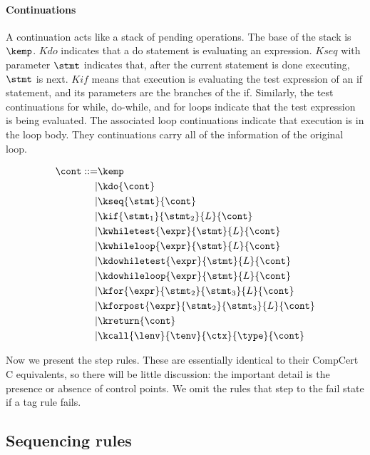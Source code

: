 \documentclass{article}
\begin{document}
\paragraph*{Continuations}
\label{app:continuations}

A continuation acts like a stack of pending operations. The base of the stack is
\(\kemp\). \(\mathit{Kdo}\) indicates that a do statement is evaluating an expression.
\(\mathit{Kseq}\) with parameter \(\stmt\) indicates that, after the current statement
is done executing, \(\stmt\) is next. \(\mathit{Kif}\) means that execution is evaluating
the test expression of an if statement, and its parameters are the branches of the
if. Similarly, the test continuations for while, do-while, and for loops indicate that
the test expression is being evaluated. The associated loop continuations indicate that
execution is in the loop body. They continuations carry all of the information of the original
loop.

\[\begin{split}
\cont ::= & \kemp \\
| & \kdo{\cont} \\
| & \kseq{\stmt}{\cont} \\
| & \kif{\stmt_1}{\stmt_2}{L}{\cont} \\
| & \kwhiletest{\expr}{\stmt}{L}{\cont} \\
| & \kwhileloop{\expr}{\stmt}{L}{\cont} \\
| & \kdowhiletest{\expr}{\stmt}{L}{\cont} \\
| & \kdowhileloop{\expr}{\stmt}{L}{\cont} \\
| & \kfor{\expr}{\stmt_2}{\stmt_3}{L}{\cont} \\
| & \kforpost{\expr}{\stmt_2}{\stmt_3}{L}{\cont} \\
| & \kreturn{\cont} \\
| & \kcall{\lenv}{\tenv}{\ctx}{\type}{\cont}
\end{split}\]

Now we present the step rules. These are essentially identical to their
CompCert C equivalents, so there will be little discussion: the important
detail is the presence or absence of control points. We omit the
rules that step to the fail state if a tag rule fails.

\subsection{Sequencing rules}

\sequencing
\end{document}
